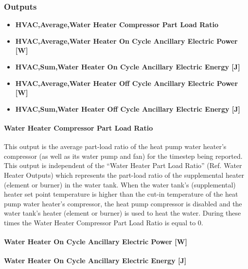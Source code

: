 \subsubsection{Outputs}\label{outputs-3-022}

\begin{itemize}
\item
  \textbf{HVAC,Average,Water Heater Compressor Part Load Ratio}
\item
  \textbf{HVAC,Average,Water Heater On Cycle Ancillary Electric Power {[}W{]}}
\item
  \textbf{HVAC,Sum,Water Heater On Cycle Ancillary Electric Energy {[}J{]}}
\item
  \textbf{HVAC,Average,Water Heater Off Cycle Ancillary Electric Power {[}W{]}}
\item
  \textbf{HVAC,Sum,Water Heater Off Cycle Ancillary Electric Energy {[}J{]}}
\end{itemize}

\paragraph{Water Heater Compressor Part Load Ratio}\label{water-heater-compressor-part-load-ratio-1}

This output is the average part-load ratio of the heat pump water heater's compressor (as well as its water pump and fan) for the timestep being reported. This output is independent of the ``Water Heater Part Load Ratio'' (Ref. Water Heater Outputs) which represents the part-load ratio of the supplemental heater (element or burner) in the water tank. When the water tank's (supplemental) heater set point temperature is higher than the cut-in temperature of the heat pump water heater's compressor, the heat pump compressor is disabled and the water tank's heater (element or burner) is used to heat the water. During these times the Water Heater Compressor Part Load Ratio is equal to 0.

\paragraph{Water Heater On Cycle Ancillary Electric Power {[}W{]}}\label{water-heater-on-cycle-ancillary-electric-power-w-1}

\paragraph{Water Heater On Cycle Ancillary Electric Energy {[}J{]}}\label{water-heater-on-cycle-ancillary-electric-energy-j-1}

